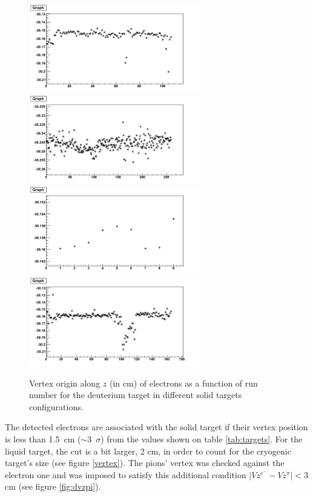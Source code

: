 \begin{figure}[tbp]
\centering
\includegraphics[width=7.5cm] {answer-fig/VertexDeutC.png} 
\includegraphics[width=7.5cm] {answer-fig/VertexDeutFe.png} 
\includegraphics[width=7.5cm] {answer-fig/VertexDeutSn.png} 
\includegraphics[width=7.5cm] {answer-fig/VertexDeutPb.png} 
\caption {Vertex origin along $z$ (in cm) of electrons as a function of run 
number for the deuterium target in different solid targets configurations.}
\label{VertexLiquid}
\end{figure}

The detected electrons are associated with the solid target if their vertex 
position is less than 1.5~cm ($\sim$3~$\sigma$) from the values shown on table 
\ref{tab:targets}. For the liquid target, the cut is a bit larger, 2 cm, in order to count for the cryogenic target's size (see figure \ref{vertex}). The pions' vertex was checked against the electron one and was imposed to satisfy this additional condition $| Vz^{e^-} - Vz^{\pi} | < 3$ cm (see figure \ref{fig:dvzpi}).

